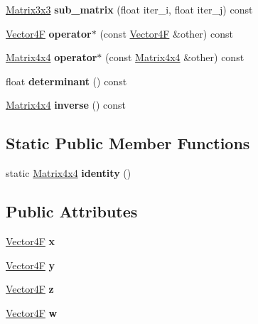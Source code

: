 \begin{DoxyCompactItemize}
\mbox{\hyperlink{class_matrix3x3}{Matrix3x3}} {\bfseries sub\+\_\+matrix} (float iter\+\_\+i, float iter\+\_\+j) const
\item 
\mbox{\label{class_matrix4x4_a3bfd662ab8ee24edbc9ad36b9158f9a7}} 
\mbox{\hyperlink{class_vector4}{Vector4F}} {\bfseries operator$\ast$} (const \mbox{\hyperlink{class_vector4}{Vector4F}} \&other) const
\item 
\mbox{\label{class_matrix4x4_a1c687b90d224b7fac251d8539b8d1a57}} 
\mbox{\hyperlink{class_matrix4x4}{Matrix4x4}} {\bfseries operator$\ast$} (const \mbox{\hyperlink{class_matrix4x4}{Matrix4x4}} \&other) const
\item 
\mbox{\label{class_matrix4x4_abd0390638fe8759c08a18f7f52082465}} 
float {\bfseries determinant} () const
\item 
\mbox{\label{class_matrix4x4_a76a41615d1de48989018a70017b8dda5}} 
\mbox{\hyperlink{class_matrix4x4}{Matrix4x4}} {\bfseries inverse} () const
\end{DoxyCompactItemize}
\subsection*{Static Public Member Functions}
\begin{DoxyCompactItemize}
\item 
\mbox{\label{class_matrix4x4_ad640d4c2c13d920072e09f902c971d6e}} 
static \mbox{\hyperlink{class_matrix4x4}{Matrix4x4}} {\bfseries identity} ()
\end{DoxyCompactItemize}
\subsection*{Public Attributes}
\begin{DoxyCompactItemize}
\item 
\mbox{\label{class_matrix4x4_a6dadbe63abfeccf9dbfbcee2de0cb1e2}} 
\mbox{\hyperlink{class_vector4}{Vector4F}} {\bfseries x}
\item 
\mbox{\label{class_matrix4x4_a04eacde50cf5ef6755f393b37c44e80a}} 
\mbox{\hyperlink{class_vector4}{Vector4F}} {\bfseries y}
\item 
\mbox{\label{class_matrix4x4_ae7044ae3cff00d00e162a6ddcd6e6cf7}} 
\mbox{\hyperlink{class_vector4}{Vector4F}} {\bfseries z}
\item 
\mbox{\label{class_matrix4x4_a8eee8245b290735528321150b0187565}} 
\mbox{\hyperlink{class_vector4}{Vector4F}} {\bfseries w}
\end{DoxyCompactItemize}


